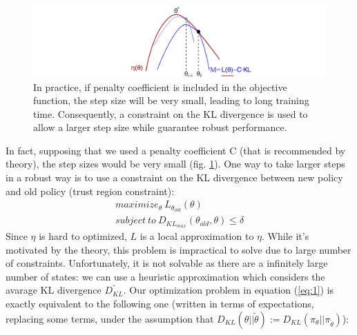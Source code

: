 \documentclass[11pt]{article}
\begin{document}
\begin{figure}[t]
        \includegraphics[width=15cm]{functions2}
        \centering
        \caption{In practice, if penalty coefficient is included in the objective function,
        the step size will be very small, leading to long training time.
        Consequently, a constraint on the KL divergence is used to allow a larger step size
        while guarantee robust performance.
        }
        \label{fig:functions2}
\end{figure}
In fact, supposing that we used a penalty coefficient C (that is recommended by theory),
the step sizes would be very small (fig. \ref{fig:functions2}). One way to take larger
steps in a robust way is to use a constraint on the KL divergence between new policy and
old policy (trust region constraint):
\begin{equation}
        \begin{split}
        maximize_{\theta} \ L_{\theta_{old}}(\theta)
        \\ \label{eq:1}
        subject \  to \ D_{KL_{max}}(\theta_{old}, \theta) \leq \delta
        \end{split}
\end{equation}
Since $\eta$ is hard to optimized, $L$ is a local approximation to $\eta$. While it's
motivated by the theory, this problem is impractical to solve due to large number of
constraints. Unfortunately, it is not solvable as there are a infinitely large number of
states: we can use a heuristic approximation which considers the avarage KL divergence
$\bar{D_{KL}}$. Our optimization problem in equation (\ref{eq:1}) is exactly equivalent to
the following one (written in terms of expectations, replacing some terms, under the
assumption that $D_{KL}(\theta|| \tilde{\theta}) :=
D_{KL}(\pi_{\theta}||\pi_{\tilde{\theta}})$):
\end{document}
